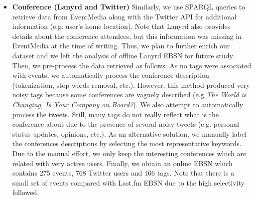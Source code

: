 \begin{itemize}
\item \textbf{Conference (Lanyrd and Twitter)} Similarly, we use SPARQL queries to retrieve data from EventMedia along with the Twitter API for additional information (e.g. user's home location). Note that Lanyrd also provides details about the conference attendees, but this information was missing in EventMedia at the time of writing. Thus, we plan to further enrich our dataset and we left the analysis of offline Lanyrd EBSN for future study. Then, we pre-process the data retrieved as follows: As no tags were associated with events, we automatically process the conference description (tokenization, stop-words removal, etc.). However, this method produced very noisy tags because some conferences are vaguely described (e.g \emph{The World is Changing, Is Your Company on Board?}).  We also attempt to automatically process the tweets. Still, many tags do not really reflect what is the conference about due to the presence of several noisy tweets (e.g. personal status updates, opinions, etc.). As an alternative solution, we manually label the conferences descriptions by selecting the most representative keywords. Due to the manual effort, we only keep the interesting conferences which are related with very active users. Finally, we obtain an online EBSN which contains 275 events, 768 Twitter users and 166 tags. Note that there is a small set of events compared with Last.fm EBSN due to the high selectivity followed.
\end{itemize}
\begin{table}[H]
\end{table}

